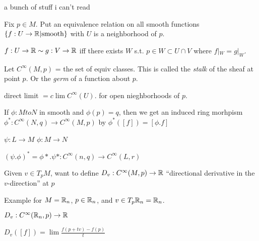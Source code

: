 \documentclass[11pt,leqno,oneside]{amsart}
\theoremstyle{mystyle} \newtheorem{thrm}[thm]{Theorem}
\theoremstyle{mystyle} \newtheorem{defi}[thm]{Definition}
\begin{document}
a bunch of stuff i can't read

Fix $p \in M$.
Put an equivalence relation on all smooth functions $\{ f : U \to {\mathbb R} | \text{smooth}\}$
with $U$ is a neighborhood of $p$.

$f:U \to {\mathbb R} \sim g:V \to {\mathbb R}$
iff
there exists $W$ s.t. $p \in W \subset U \cap V$ where $f|_W = g|_W$.

Let $C^\infty(M,p)$ = the set of equiv classes.  This is called the \emph{stalk} of the sheaf at point $p$.  Or the \emph{germ} of a function about $p$.

direct limit
$= c\lim C^\infty(U)$.
for open nieghborhoods of $p$.

If $\phi : M to N$ in smooth and $\phi(p) = q$, then we get an induced ring morhpism
$\phi^* : C^\infty(N,q) \to C^\infty(M,p)$ by
$\phi^*([f]) = [\phi.f]$

$\psi : L \to M$
$\phi : M \to N$

$(\psi.\phi)^* = \phi*.\psi* : C^\infty(n,q) \to C^\infty(L,r)$

Given $v \in T_pM$, want to define
$D_v : C^\infty(M,p) \to {\mathbb R}$
``directional derivative in the $v$-direction'' at $p$

Example for $M = {\mathbb R}_n$, $p \in {\mathbb R}_n$, and $v \in T_p{\mathbb R}_n = {\mathbb R}_n$.

$D_v : C^\infty({\mathbb R}_n, p) \to {\mathbb R}$

$D_v([f]) = \lim \frac{f(p + tv) - f(p)}{t}$
\end{document}
